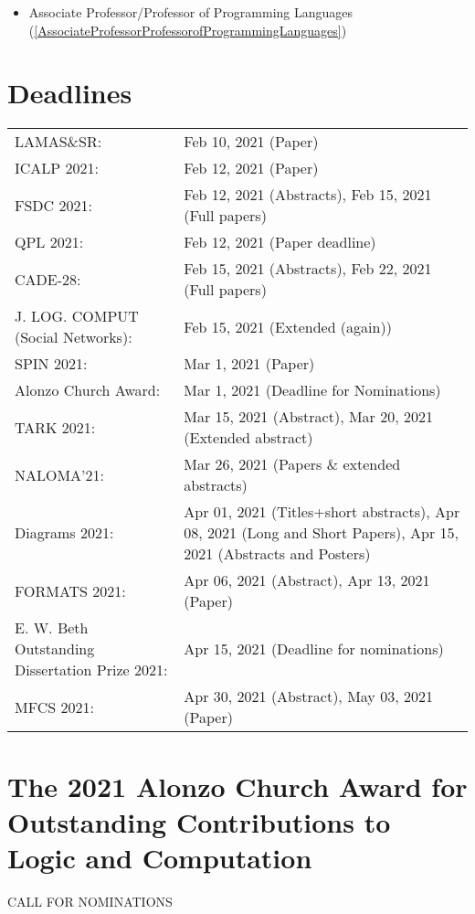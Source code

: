 \documentclass{article}
\begin{document}
\begin{itemize}
\begin{itemize}\item Associate Professor/Professor of Programming Languages (\cref{AssociateProfessorProfessorofProgrammingLanguages})
\end{itemize} 
\end{itemize}\section{Deadlines}\label{deadlines}\begin{tabulary}{\linewidth}{LL}LAMAS\&SR:  & Feb 10, 2021 (Paper) \\
ICALP 2021:  & Feb 12, 2021 (Paper) \\
FSDC 2021:  & Feb 12, 2021 (Abstracts), Feb 15, 2021 (Full papers) \\
QPL 2021:  & Feb 12, 2021 (Paper deadline) \\
CADE-28:  & Feb 15, 2021 (Abstracts), Feb 22, 2021 (Full papers) \\
J. LOG. COMPUT (Social Networks):  & Feb 15, 2021 (Extended (again)) \\
SPIN 2021:  & Mar 1, 2021 (Paper) \\
Alonzo Church Award:  & Mar 1, 2021 (Deadline for Nominations) \\
TARK 2021:  & Mar 15, 2021 (Abstract), Mar 20, 2021 (Extended abstract) \\
NALOMA'21:  & Mar 26, 2021 (Papers \& extended abstracts) \\
Diagrams 2021:  & Apr 01, 2021 (Titles+short abstracts), Apr 08, 2021 (Long and Short Papers), Apr 15, 2021 (Abstracts and Posters) \\
FORMATS 2021:  & Apr 06, 2021 (Abstract), Apr 13, 2021 (Paper) \\
E. W. Beth Outstanding Dissertation Prize 2021:  & Apr 15, 2021 (Deadline for nominations) \\
MFCS 2021:  & Apr 30, 2021 (Abstract), May 03, 2021 (Paper) \\
\end{tabulary}
\section{The 2021 Alonzo Church Award for Outstanding Contributions to Logic and Computation}\label{The2021AlonzoChurchAwardforOutstandingContributionstoLogicandComputation}CALL FOR NOMINATIONS 
\end{document}
